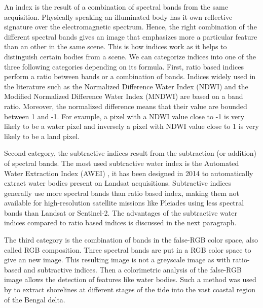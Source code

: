 \documentclass[remotesensing,article,submit,pdftex,moreauthors]{Definitions/mdpi}
\begin{document}
An index is the result of a combination of spectral bands from the same acquisition.
Physically speaking an illuminated body has it own reflective signature over the electromagnetic spectrum.
Hence, the right combination of the different spectral bands gives an image that emphasizes more a particular feature than an other in the same scene.
This is how indices work as it helps to distinguish certain bodies from a scene.
We can categorize indices into one of the three following categories depending on its formula.
First, ratio based indices perform a ratio between bands or a combination of bands.
Indices widely used in the literature such as the Normalized Difference Water Index (NDWI) \citep{GAO1996257} and the Modified Normalized Difference Water Index (MNDWI) \citep{Xu2006} are based on a band ratio.
Moreover, the normalized difference means that their value are bounded between 1 and -1.
For example, a pixel with a NDWI value close to -1 is very likely to be a water pixel and inversely a pixel with NDWI value close to 1 is very likely to be a land pixel.

Second category, the subtractive indices result from the subtraction (or addition) of spectral bands.
The most used subtractive water index is the Automated Water Extraction Index (AWEI) \citep{FEYISA201423}, it has been designed in 2014 to automatically extract water bodies present on Landsat acquisitions.
Subtractive indices generally use more spectral bands than ratio based index, making them not available for high-resolution satellite missions like Pleiades using less spectral bands than Landsat or Sentinel-2.
The advantages of the subtractive water indices compared to ratio based indices is discussed in the next paragraph.

The third category is the combination of bands in the false-RGB color space, also called RGB composition.
Three spectral bands are put in a RGB color space to give an new image.
This resulting image is not a greyscale image as with ratio-based and subtractive indices.
Then a colorimetric analysis of the false-RGB image allows the detection of features like water bodies.\citep{PEKEL2014704}
Such a method was used by \citep{Khan2019} to extract shorelines at different stages of the tide into the vast coastal region of the Bengal delta. %
\par
\end{document}

